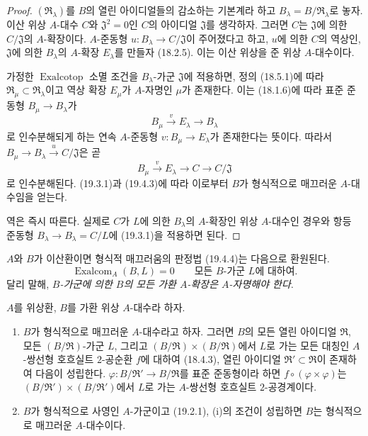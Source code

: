 \begin{proof}
$(\mathfrak R_\lambda)$를 $B$의 열린 아이디얼들의 감소하는
기본계라 하고 $B_\lambda=B/\mathfrak R_\lambda$로 놓자. 이산
위상 $A$-대수 $C$와 $\mathfrak J^2=0$인 $C$의 아이디얼
$\mathfrak J$를 생각하자. 그러면 $C$는 $\mathfrak J$에 의한
$C/\mathfrak J$의 $A$-확장이다. $A$-준동형
$u:B_\lambda\to C/\mathfrak J$이 주어졌다고 하고, $u$에 의한
$C$의 역상인, $\mathfrak J$에 의한 $B_\lambda$의 $A$-확장
$E_\lambda$를 만들자 (18.2.5). 이는 이산 위상을 준 위상
$A$-대수이다.

가정한 $\operatorname{Exalcotop}$ 소멸 조건을
$B_\lambda$-가군 $\mathfrak J$에 적용하면, 정의 (18.5.1)에 따라
$\mathfrak R_\mu\subset\mathfrak R_\lambda$이고 역상 확장
$E_\mu$가 $A$-자명인 $\mu$가 존재한다. 이는 (18.1.6)에 따라
표준 준동형 $B_\mu\to B_\lambda$가
\[
  B_\mu\xrightarrow{v}E_\lambda\longrightarrow B_\lambda
\]
로 인수분해되게 하는 연속 $A$-준동형
$v:B_\mu\to E_\lambda$가 존재한다는 뜻이다. 따라서
$B_\mu\to B_\lambda\xrightarrow{u}C/\mathfrak J$은 곧
\[
  B_\mu\xrightarrow{v}E_\lambda\longrightarrow C
  \longrightarrow C/\mathfrak J
\]
로 인수분해된다. (19.3.1)과 (19.4.3)에 따라 이로부터 $B$가
형식적으로 매끄러운 $A$-대수임을 얻는다.

역은 즉시 따른다. 실제로 $C$가 $L$에 의한 $B_\lambda$의
$A$-확장인 위상 $A$-대수인 경우와 항등 준동형
$B_\lambda\to B_\lambda=C/L$에 (19.3.1)을 적용하면 된다.
\end{proof}

$A$와 $B$가 이산환이면 형식적 매끄러움의 판정법 (19.4.4)는
다음으로 환원된다.
\begin{equation}
\tag{19.4.4.1}
\label{0.19.4.4.1-fr}
\operatorname{Exalcom}_A(B,L)=0
\qquad\text{모든 $B$-가군 $L$에 대하여}.
\end{equation}
달리 말해, \emph{$B$-가군에 의한 $B$의 모든 가환 $A$-확장은
$A$-자명해야 한다}.

\begin{corollary}[19.4.5]
\label{0.19.4.5-fr}
$A$를 위상환, $B$를 가환 위상 $A$-대수라 하자.
\begin{enumerate}
  \item[(i)] $B$가 형식적으로 매끄러운 $A$-대수라고 하자. 그러면
  $B$의 모든 열린 아이디얼 $\mathfrak R$, 모든
  $(B/\mathfrak R)$-가군 $L$, 그리고
  $(B/\mathfrak R)\times(B/\mathfrak R)$에서 $L$로 가는 모든
  대칭인 $A$-쌍선형 호흐실트 $2$-공순환 $f$에 대하여 (18.4.3),
  열린 아이디얼 $\mathfrak R'\subset\mathfrak R$이 존재하여
  다음이 성립한다. $\varphi:B/\mathfrak R'\to B/\mathfrak R$를
  표준 준동형이라 하면
  $f\circ(\varphi\times\varphi)$는
  $(B/\mathfrak R')\times(B/\mathfrak R')$에서 $L$로 가는
  $A$-쌍선형 호흐실트 $2$-공경계이다.
  \item[(ii)] $B$가 형식적으로 사영인 $A$-가군이고 (19.2.1),
  (i)의 조건이 성립하면 $B$는 형식적으로 매끄러운 $A$-대수이다.
\end{enumerate}
\end{corollary}

